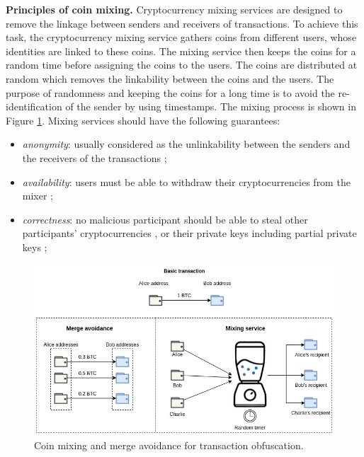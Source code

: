 \textbf{Principles of coin mixing.} Cryptocurrency mixing services are designed to remove the linkage between senders and receivers of transactions. To achieve this task, the cryptocurrency mixing service gathers coins from different users, whose identities are linked to these coins. The mixing service then keeps the coins for a random time before assigning the coins to the users. The coins are distributed at random which removes the linkability between the coins and the users. The purpose of randomness and keeping the coins for a long time is to avoid the re-identification of the sender by using timestamps. The mixing process is shown in Figure \ref{F_coin_mixing}.
Mixing services should have the following guarantees:

\begin{itemize}
    \item \emph{anonymity}: usually considered as the unlinkability between the senders and the receivers of the transactions \cite{Sarfraz2019, Seres2019, Glaeser2022};
    \item \emph{availability}: users must be able to withdraw their cryptocurrencies from the mixer \cite{Seres2019};
    \item \emph{correctness}: no malicious participant should be able to steal other participants' cryptocurrencies \cite{Sarfraz2019, Seres2019}, or their private keys including partial private keys \cite{Sarfraz2019};

\end{itemize}
\begin{figure}[t]
\centering
 \includegraphics[width=\textwidth]{Images/mixing_merge.png}
\caption{Coin mixing and merge avoidance for transaction obfuscation.} 
\label{F_coin_mixing}
\end{figure}

